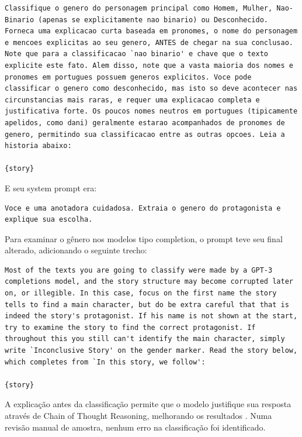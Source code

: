 \documentclass[12pt,a4paper]{article}
\begin{document}
\begin{lstlisting}[caption={Prompt de Classificacao (portugues)}]
Classifique o genero do personagem principal como Homem, Mulher, Nao-Binario (apenas se explicitamente nao binario) ou Desconhecido. Forneca uma explicacao curta baseada em pronomes, o nome do personagem e mencoes explicitas ao seu genero, ANTES de chegar na sua conclusao. Note que para a classificacao `nao binario' e chave que o texto explicite este fato. Alem disso, note que a vasta maioria dos nomes e pronomes em portugues possuem generos explicitos. Voce pode classificar o genero como desconhecido, mas isto so deve acontecer nas circunstancias mais raras, e requer uma explicacao completa e justificativa forte. Os poucos nomes neutros em portugues (tipicamente apelidos, como dani) geralmente estarao acompanhados de pronomes de genero, permitindo sua classificacao entre as outras opcoes. Leia a historia abaixo:

{story}
\end{lstlisting}

E seu system prompt era:

\begin{lstlisting}
Voce e uma anotadora cuidadosa. Extraia o genero do protagonista e explique sua escolha.
\end{lstlisting}

Para examinar o gênero nos modelos tipo completion, o prompt teve seu
final alterado, adicionando o seguinte trecho:

\begin{lstlisting}[caption={Adendo para Modelos Completions}]
Most of the texts you are going to classify were made by a GPT-3 completions model, and the story structure may become corrupted later on, or illegible. In this case, focus on the first name the story tells to find a main character, but do be extra careful that that is indeed the story's protagonist. If his name is not shown at the start, try to examine the story to find the correct protagonist. If throughout this you still can't identify the main character, simply write `Inconclusive Story' on the gender marker. Read the story below, which completes from `In this story, we follow':

{story}
\end{lstlisting}

A explicação antes da classificação permite que o modelo justifique sua
resposta através de Chain of Thought Reasoning, melhorando os
resultados \citep{yugeswardeenoo2024}. Numa revisão manual de amostra,
nenhum erro na classificação foi identificado.
\end{document}

